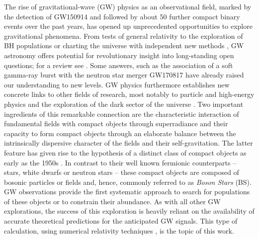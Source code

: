 \documentclass[]{iopart}
\renewcommand{\mr}[1]{\textcolor{purple}{[{\it\textbf{MR: #1}}]} }
\begin{document}
The rise of gravitational-wave (GW) physics as an observational field,
marked by the detection of GW150914 \cite{Abbott:2016blz} and followed by about 50 further
compact binary events \cite{LIGOScientific:2018mvr,LIGOScientific:2020ibl}
over the past years, has opened
up unprecedented opportunities to explore gravitational phenomena.
From tests of general relativity
\cite{Berti:2015itd,TheLIGOScientific:2016src,Abbott:2018lct,LIGOScientific:2019fpa,LIGOScientific:2020tif,Moore:2021eok}
to the exploration
of BH populations \cite{Trifiro:2015zda,Belczynski:2017gds,LIGOScientific:2020kqk,Baibhav:2020xdf,Gerosa:2021mno}
or charting the universe with independent
new methods \cite{LIGOScientific:2017adf,LIGOScientific:2019zcs}, GW astronomy offers potential for
revolutionary insight into long-standing open questions;
for a review see \cite{Barack:2018yly}.
Some answers,
such as the association of a soft gamma-ray burst with the neutron star merger GW170817
\cite{TheLIGOScientific:2017qsa,Monitor:2017mdv} have already raised our understanding to new levels.
GW physics furthermore establishes new concrete links to other
fields of research, most notably to particle and high-energy
physics and the exploration of the dark sector of the universe
\cite{Cardoso:2014uka,Barack:2018yly}.
Two important ingredients of this remarkable connection are the
characteristic interaction of fundamental fields with compact
objects through superradiance \cite{Brito:2015oca} and their capacity
to form compact objects through an elaborate balance between
the intrinsically dispersive character of the fields and their
self-gravitation. The latter feature has given rise to the
hypothesis of a distinct class of compact objects as early as the
1950s \cite{Wheeler:1955zz}. In contrast to their well known fermionic counterparts --
stars, white dwarfs or neutron stars -- these compact objects are composed
of bosonic particles or fields and, hence, commonly referred to as
{\em Boson Stars} (BS). GW observations provide the first systematic
approach to search for populations of these objects or to constrain their
abundance. As with all other GW explorations, the success of
this exploration is heavily reliant on the availability of accurate
theoretical predictions for the anticipated GW signals.
This type of
calculation, using numerical relativity techniques
\cite{Baumgarte:2021skc}, is the topic of this work.
\end{document}
